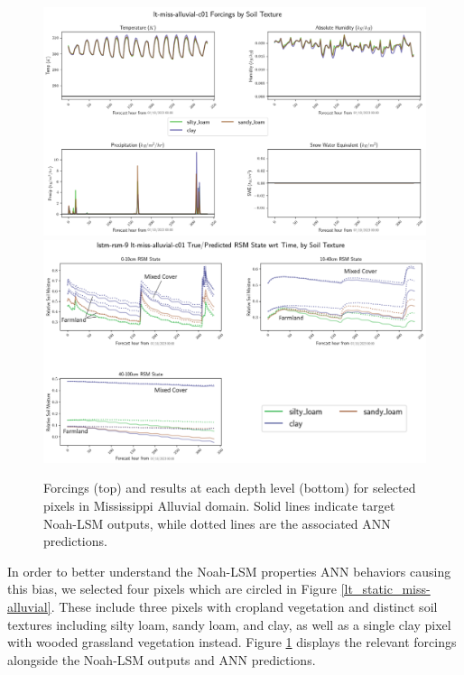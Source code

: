 \begin{figure}[h!p]
    \centering

    \includegraphics[width=.98\linewidth,draft=false]{figures/lt-miss-alluvial/eval-grid_lt-miss-alluvial-c01_lstm-rsm-9_rsm_keep-all_bias_forcings.png}
    \includegraphics[width=.98\linewidth,draft=false]{figures/lt-miss-alluvial/eval-grid_lt-miss-alluvial-c01_lstm-rsm-9_rsm_keep-all_bias_state-seq-textures-all_labeled.png}

    \caption{Forcings (top) and results at each depth level (bottom) for selected pixels in Mississippi Alluvial domain. Solid lines indicate target Noah-LSM outputs, while dotted lines are the associated ANN predictions.}
    \label{lt_sequence-c01_miss-alluvial}
\end{figure}

In order to better understand the Noah-LSM properties ANN behaviors causing this bias, we selected four pixels which are circled in Figure \ref{lt_static_miss-alluvial}. These include three pixels with cropland vegetation and distinct soil textures including silty loam, sandy loam, and clay, as well as a single clay pixel with wooded grassland vegetation instead. Figure \ref{lt_sequence-c01_miss-alluvial} displays the relevant forcings alongside the Noah-LSM outputs and ANN predictions.

